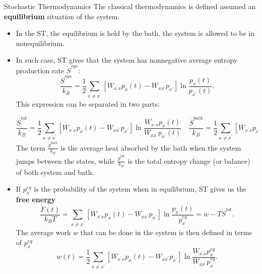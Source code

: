 \documentclass[final]{beamer}
\newlength{\colwidth}
\begin{document}
\begin{frame}[t]
\begin{columns}[t]
\begin{column}{\colwidth}
\begin{block}{Stochastic Thermodynamics}
The classical thermodynamics is defined assumed an {\bf equilibrium} situation of the system.
\begin{itemize}
\item In the ST, the equilibrium is held by the bath, the system is allowed to be in nonequilibrium.
\item In such case, ST gives that the system has nonnegative average entropy production rate $\dot{S}^{sys}$:
%
\begin{equation}
\frac{\dot{S}^{sys}}{k_B} = \frac{1}{2} \sum_{x \neq x^\prime} \left[ W_{x^\prime x} p_x(t) -  W_{x x^\prime}p_{x^\prime} \right] \ln \frac{p_x(t)}{p_{x^\prime}(t)}.
\end{equation}
%
This expression can be separated in two parts:

\begin{equation}
\frac{\dot{S}^{tot}}{k_B}  = \frac{1}{2} \sum_{x \neq x^\prime} \left[ W_{x^\prime x} p_x(t) -  W_{x x^\prime}p_{x^\prime} \right] \ln \frac{W_{x^\prime x} p_x(t)}{W_{xx^\prime}p_{x^\prime}(t)}
\quad 
\frac{\dot{S}^{bath}}{k_B}  = \frac{1}{2} \sum_{x \neq x^\prime} \left[ W_{x^\prime x} p_x(t) -  W_{x x^\prime}p_{x^\prime} \right] \ln \frac{W_{x^\prime x}}{W_{xx^\prime}}
\end{equation}
The term $\frac{\dot{S}^{bath}}{k_B}$ is the average heat absorbed by the bath when the system jumps between the states, while $\frac{\dot{S}^{tot}}{k_B}$ is the total entropy change (or balance) of both system and bath.

\item If $p_x^{eq}$ is the probability of the system when in equilibrium, ST gives us the {\bf free energy}
%
\begin{equation}
\frac{\dot{F}(t)}{k_B T} = \sum_{x \neq x^\prime} \left[ W_{x^\prime x} p_x(t) -  W_{x x^\prime}p_{x^\prime} \right] \ln \frac{p_x(t)}{p_{x^\prime}^{eq}} = w - T \dot{S}^{tot}.
\end{equation}
The average work $w$ that can be done in the system is then defined in terms of $p_x^{eq}$
\begin{equation}
w(t) = \frac{1}{2} \sum_{x \neq x^\prime} \left[ W_{x^\prime x} p_x(t) -  W_{x x^\prime}p_{x^\prime} \right] \ln \frac{W_{x^\prime x} p_x^{eq}}{W_{xx^\prime}p_{x^\prime}^{eq}}.
\end{equation}
\end{itemize}
\end{block}


\end{column}
\end{columns}
\end{frame}
\end{document}
